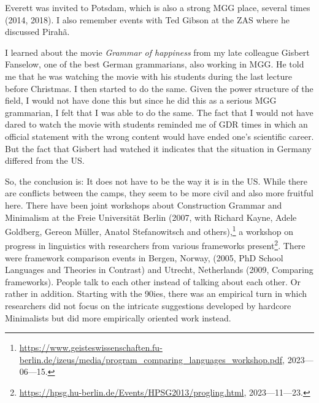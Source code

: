 \documentclass[output=paper,colorlinks,citecolor=brown]{langscibook}
\begin{document}
Everett was invited to Potsdam, which is also a strong MGG place, several times (2014, 2018). I also
remember events with Ted Gibson at the ZAS where he discussed Pirahã.

I learned about the movie \emph{Grammar of happiness} from my late colleague Gisbert Fanselow, one of
the best German grammarians, also working in MGG. He told me that he was watching the movie with his
students during the last lecture before Christmas. I then started to do the same. Given the power
structure of the field, I would not have done this but since he did this as a serious MGG grammarian, I
felt that I was able to do the same. The fact that I would not have dared to watch the movie with
students reminded me of GDR times in which an official statement with the wrong content would have
ended one's scientific career. But the fact that Gisbert had watched it indicates that the situation in
Germany differed from the US.






So, the conclusion is: It does not have to be the way it is in the US. While there are conflicts between the camps,
they seem to be more civil and also more fruitful here. There have been joint workshops about
Construction Grammar and Minimalism at the Freie Universität Berlin (2007, with Richard Kayne, Adele
Goldberg, Gereon Müller, Anatol Stefanowitsch and others),\footnote{
\url{https://www.geisteswissenschaften.fu-berlin.de/izeus/media/program_comparing_languages_workshop.pdf},
2023—06—15.
} a workshop on progress
in linguistics with researchers from various frameworks present\footnote{
\url{https://hpsg.hu-berlin.de/Events/HPSG2013/progling.html}, 2023—11—23.
}. There were framework comparison
events in Bergen, Norway, (2005, PhD School Languages and Theories in Contrast) and Utrecht,
Netherlands (2009, Comparing frameworks). People talk to each
other instead of talking about each other. Or rather in addition. Starting with the 90ies, there was an empirical
turn in which researchers did not focus on the intricate suggestions developed by hardcore Minimalists
but did more empirically oriented work instead.
\end{document}

